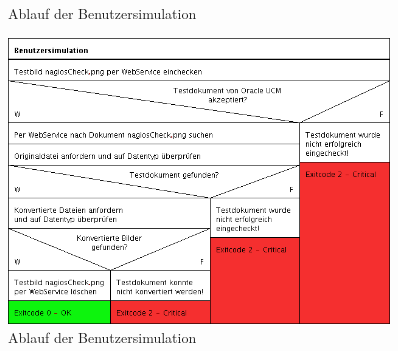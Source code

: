 \begin{figure}[ht]
	\centering
		\caption{Ablauf der Benutzersimulation}
		\label{usersim}
\end{figure}
%
\begin{figure}[ht]
	\centering
	   \includegraphics[width=0.9\textwidth]{bilder/Benutzersimulation.png}
		\caption{Ablauf der Benutzersimulation}
		\label{user-sim}
\end{figure}



